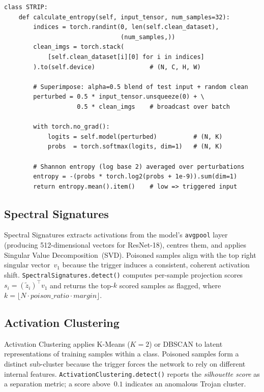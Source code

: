 \documentclass[12pt, letterpaper]{article}
\begin{document}
\begin{singlespace}
\begin{lstlisting}[style=pystyle, caption={STRIP runtime entropy calculation
  (\texttt{defenses.py}).}, label=lst:strip]
class STRIP:
    def calculate_entropy(self, input_tensor, num_samples=32):
        indices = torch.randint(0, len(self.clean_dataset),
                                (num_samples,))
        clean_imgs = torch.stack(
            [self.clean_dataset[i][0] for i in indices]
        ).to(self.device)               # (N, C, H, W)

        # Superimpose: alpha=0.5 blend of test input + random clean
        perturbed = 0.5 * input_tensor.unsqueeze(0) + \
                    0.5 * clean_imgs    # broadcast over batch

        with torch.no_grad():
            logits = self.model(perturbed)          # (N, K)
            probs  = torch.softmax(logits, dim=1)   # (N, K)

        # Shannon entropy (log base 2) averaged over perturbations
        entropy = -(probs * torch.log2(probs + 1e-9)).sum(dim=1)
        return entropy.mean().item()    # low => triggered input
\end{lstlisting}
\end{singlespace}

\subsection{Spectral Signatures~\cite{tran2018spectral}}

Spectral Signatures extracts activations from the model's \texttt{avgpool}
layer (producing 512-dimensional vectors for ResNet-18), centres them, and
applies Singular Value Decomposition~(SVD).  Poisoned samples align with the
top right singular vector~$v_1$ because the trigger induces a consistent,
coherent activation shift.
\texttt{SpectralSignatures.detect()} computes per-sample projection scores
$s_i = (\tilde{z}_i)^\top v_1$ and returns the top-$k$ scored samples
as flagged, where
$k = \lfloor N \cdot \mathit{poison\_ratio} \cdot \mathit{margin}\rfloor$.

\subsection{Activation Clustering~\cite{chen2019activation}}

Activation Clustering applies K-Means ($K=2$) or DBSCAN to latent
representations of training samples within a class.  Poisoned samples form a
distinct sub-cluster because the trigger forces the network to rely on
different internal features.
\texttt{ActivationClustering.detect()} reports the \emph{silhouette score}
as a separation metric; a score above~$0.1$ indicates an anomalous
Trojan cluster.
\end{document}
